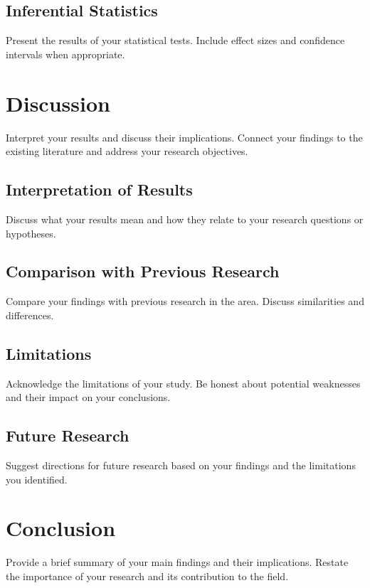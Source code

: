 \documentclass[12pt,letterpaper]{article}
\begin{document}
\subsection{Inferential Statistics}

Present the results of your statistical tests. Include effect sizes and confidence intervals when appropriate.

\section{Discussion}

Interpret your results and discuss their implications. Connect your findings to the existing literature and address your research objectives.

\subsection{Interpretation of Results}

Discuss what your results mean and how they relate to your research questions or hypotheses.

\subsection{Comparison with Previous Research}

Compare your findings with previous research in the area. Discuss similarities and differences.

\subsection{Limitations}

Acknowledge the limitations of your study. Be honest about potential weaknesses and their impact on your conclusions.

\subsection{Future Research}

Suggest directions for future research based on your findings and the limitations you identified.

\section{Conclusion}

Provide a brief summary of your main findings and their implications. Restate the importance of your research and its contribution to the field.
\end{document}
